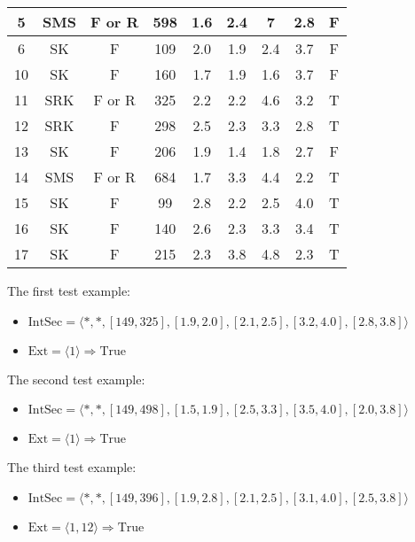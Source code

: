 \documentclass[12pt]{report}
\begin{document}
\begin{solution}
\begin{enumerate}
\begin{table}[H]
\begin{tabular}{|c|c|c|c|c|c|c|c|c|}
          5  & SMS    & F or R & 598   & 1.6 & 2.4  & 7   & 2.8 & F         \\ \hline
          6  & SK     & F      & 109   & 2.0 & 1.9  & 2.4 & 3.7 & F         \\ \hline
          10 & SK     & F      & 160   & 1.7 & 1.9  & 1.6 & 3.7 & F         \\ \hline
          11 & SRK    & F or R & 325   & 2.2 & 2.2  & 4.6 & 3.2 & T         \\ \hline
          12 & SRK    & F      & 298   & 2.5 & 2.3  & 3.3 & 2.8 & T         \\ \hline
          13 & SK     & F      & 206   & 1.9 & 1.4  & 1.8 & 2.7 & F         \\ \hline
          14 & SMS    & F or R & 684   & 1.7 & 3.3  & 4.4 & 2.2 & T         \\ \hline
          15 & SK     & F      & 99    & 2.8 & 2.2  & 2.5 & 4.0 & T         \\ \hline
          16 & SK     & F      & 140   & 2.6 & 2.3  & 3.3 & 3.4 & T         \\ \hline
          17 & SK     & F      & 215   & 2.3 & 3.8  & 4.8 & 2.3 & T         \\ \hline
          \end{tabular}
          \end{table}
      The first test example:
      \begin{itemize}
        \item $\text{IntSec} = \langle *, *, [ 149, 325], [1.9, 2.0], [2.1, 2.5], [3.2, 4.0], [2.8, 3.8] \rangle$
        \item $\text{Ext} = \langle 1 \rangle \Longrightarrow \text{True}$
      \end{itemize}
      The second test example:
      \begin{itemize}
        \item $\text{IntSec} = \langle *, *, [ 149, 498], [1.5, 1.9], [2.5, 3.3], [3.5, 4.0], [2.0, 3.8] \rangle$
        \item $\text{Ext} = \langle 1 \rangle \Longrightarrow \text{True}$
      \end{itemize}
      The third test example:
      \begin{itemize}
        \item $\text{IntSec} = \langle *, *, [ 149, 396], [1.9, 2.8], [2.1, 2.5], [3.1, 4.0], [2.5, 3.8] \rangle$
        \item $\text{Ext} = \langle 1, 12 \rangle \Longrightarrow \text{True}$
      \end{itemize}

\end{enumerate}
\end{solution}
\end{document}

